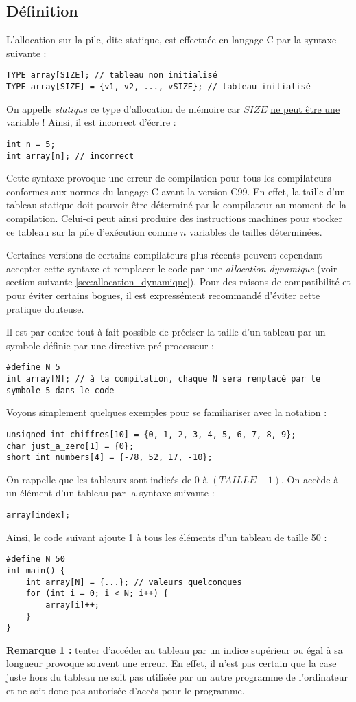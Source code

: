 \documentclass[../../../main.tex]{subfiles}
\begin{document}
\subsection{Définition}
\label{sub:d_finition}
L'allocation sur la pile, dite statique, est effectuée en langage C par la syntaxe suivante :
\begin{verbatim}
TYPE array[SIZE]; // tableau non initialisé
TYPE array[SIZE] = {v1, v2, ..., vSIZE}; // tableau initialisé
\end{verbatim}
On appelle \textit{statique} ce type d'allocation de mémoire car $SIZE$ \underline{ne peut être une variable !} Ainsi, il est incorrect d'écrire :
\begin{verbatim}
int n = 5;
int array[n]; // incorrect
\end{verbatim}
Cette syntaxe provoque une erreur de compilation pour tous les compilateurs conformes aux normes du langage C avant la version C99. 
En effet, la taille d'un tableau statique doit pouvoir être déterminé par le compilateur au moment de la compilation. Celui-ci peut ainsi produire des instructions machines pour stocker ce tableau sur la pile d'exécution comme $n$ variables de tailles déterminées.

Certaines versions de certains compilateurs plus récents peuvent cependant accepter cette syntaxe et remplacer le code par une \textit{allocation dynamique} (voir section suivante \ref{sec:allocation_dynamique}). Pour des raisons de compatibilité et pour éviter certains bogues, il est expressément recommandé d'éviter cette pratique douteuse.
 
Il est par contre tout à fait possible de préciser la taille d'un tableau par un symbole définie par une directive pré-processeur :
\begin{verbatim}
#define N 5
int array[N]; // à la compilation, chaque N sera remplacé par le symbole 5 dans le code
\end{verbatim}
Voyons simplement quelques exemples pour se familiariser avec la notation :
\begin{verbatim}
unsigned int chiffres[10] = {0, 1, 2, 3, 4, 5, 6, 7, 8, 9};
char just_a_zero[1] = {0};
short int numbers[4] = {-78, 52, 17, -10};
\end{verbatim}
On rappelle que les tableaux sont indicés de 0 à $(TAILLE - 1)$. On accède à un élément d'un tableau par la syntaxe suivante :
\begin{verbatim}
array[index];
\end{verbatim}
Ainsi, le code suivant ajoute 1 à tous les éléments d'un tableau de taille 50 :
\begin{verbatim}
#define N 50
int main() {
	int array[N] = {...}; // valeurs quelconques
	for (int i = 0; i < N; i++) {
		array[i]++;
	}
}
\end{verbatim}
\textbf{Remarque 1 :} tenter d'accéder au tableau par un indice supérieur ou égal à sa longueur provoque souvent une erreur. En effet, il n'est pas certain que la case juste hors du tableau ne soit pas utilisée par un autre programme de l'ordinateur et ne soit donc pas autorisée d'accès pour le programme.
 
\end{document}

